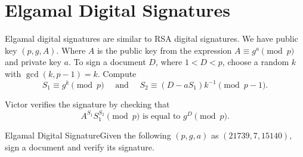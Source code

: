 \section{Elgamal Digital Signatures}

Elgamal digital signatures are similar to RSA digital signatures. We have public key \((p, g, A)\). Where \(A\) is the public key from the expression \(A \equiv g^{a} \pmod{p}\) and private key \(a\). To sign a document \(D\), where \(1 < D < p\), choose a random \(k\) with \(\gcd(k,p-1) = k\).  Compute
\[
    S_{1} \equiv g^{k} \pmod{p} \quad \text{ and } \quad S_{2} \equiv (D - aS_{1})k^{-1} \pmod{p-1}.
\]

Victor verifies the signature by checking that
\[
    A^{S_{1}} S^{S_{2}}_{1} \pmod{p} \text{ is equal to } g^{D} \pmod{p}.
\]

\begin{example}
    {Elgamal Digital Signature}Given the following \((p,g,a)\) as \((21739,7,15140)\), sign a document and verify its signature.
\end{example}


